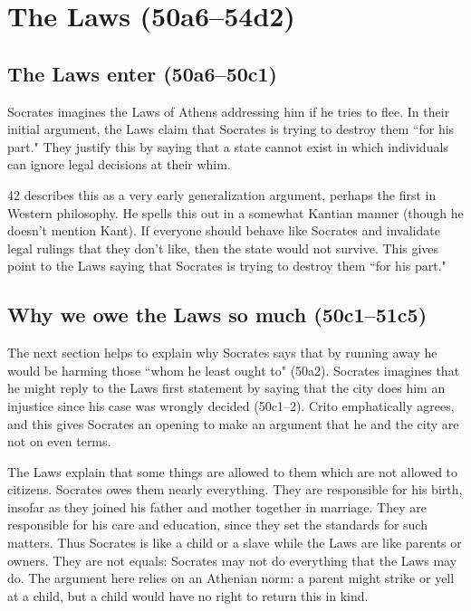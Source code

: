 \documentclass[11pt]{article}
\begin{document}
\section{The Laws (50a6--54d2)}

\subsection{The Laws enter (50a6--50c1)}

Socrates imagines the Laws of Athens addressing him if he tries to flee.  In their initial argument, the Laws claim that Socrates is trying to destroy them ``for his part."  They justify this by saying that a state cannot exist in which individuals can ignore legal decisions at their whim.

\citet{kraut1984} 42 describes this as a very early generalization argument, perhaps the first in Western philosophy.  He spells this out in a somewhat Kantian manner (though he doesn't mention Kant).  If everyone should behave like Socrates and invalidate legal rulings that they don't like, then the state would not survive.  This gives point to the Laws saying that Socrates is trying to destroy them ``for his part."

\subsection{Why we owe the Laws so much (50c1--51c5)}

The next section helps to explain why Socrates says that by running away he would be harming those ``whom he least ought to" (50a2).  Socrates imagines that he might reply to the Laws first statement by saying that the city does him an injustice since his case was wrongly decided (50c1--2).  Crito emphatically agrees, and this gives Socrates an opening to make an argument that he and the city are not on even terms.

The Laws explain that some things are allowed to them which are not allowed to citizens.  Socrates owes them nearly everything.  They are responsible for his birth, insofar as they joined his father and mother together in marriage.  They are responsible for his care and education, since they set the standards for such matters.  Thus Socrates is like a child or a slave while the Laws are like parents or owners. They are not equals: Socrates may not do everything that the Laws may do.  The argument here relies on an Athenian norm: a parent might strike or yell at a child, but a child would have no right to return this in kind.
\end{document}
